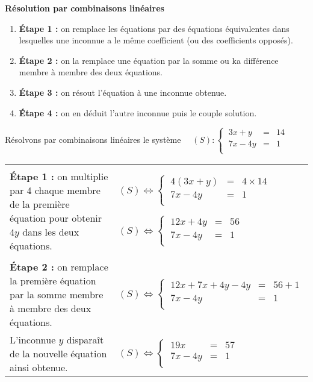 \documentclass[a4paper,11pt,cours]{nsi}
\begin{document}
\begin{methode}[ ]\textbf{Résolution par combinaisons linéaires}
	\begin{enumerate}[label=\textbullet]
		\item 	\textbf{\'Etape 1 :} on remplace les équations par des équations équivalentes dans lesquelles une inconnue a le même coefficient (ou des coefficients opposés).
		\item 	\textbf{\'Etape 2 :} on la remplace une équation par la somme ou ka différence membre à membre des deux équations.
		\item	\textbf{\'Etape 3 :} on résout l'équation à une inconnue obtenue.
		\item	\textbf{\'Etape 4 :} on en déduit l'autre inconnue puis le couple solution.	
	\end{enumerate}
	Résolvons par combinaisons linéaires le système $\quad (S):\left\{
	\begin{array}{cll}
		\ 3x+y&=&14 \\
		\ 7x-4y&=&1 \\
	\end{array} \right.$\\
	
	\begin{tabular}{p{8cm}p{8cm}}
		\textbf{\'Etape 1 :} on multiplie par 4 chaque membre de la première équation pour obtenir $4y$ dans les deux équations. & $(S) \Leftrightarrow \left\{
		\begin{array}{cll}
			\ 4(3x+y)&=&4\times14 \\
			\ 7x-4y&=&1 \\
		\end{array} \right.$
		
		$(S) \Leftrightarrow \left\{
		\begin{array}{cll}
			\ 12x+4y&=&56 \\
			\ 7x-4y&=&1 \\
		\end{array} \right.$\\
		
		\textbf{\'Etape 2 :} on remplace la première équation par la somme membre à membre des deux équations. &  $(S) \Leftrightarrow \left\{
		\begin{array}{cll}
			\ 12x+7x+4y-4y&=&56+1 \\
			\ 7x-4y&=&1 \\
		\end{array} \right.$\\
		L'inconnue $y$ disparaît de la nouvelle équation ainsi obtenue. & $(S) \Leftrightarrow \left\{
		\begin{array}{lll}
			\ 19x&=&57 \\
			\ 7x-4y&=&1 \\
		\end{array} \right.$\\
		

\end{tabular}
\end{methode}
\end{document}
